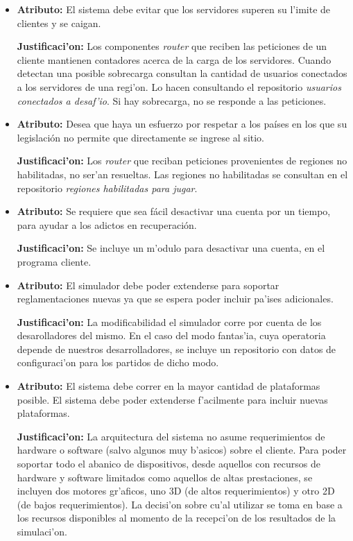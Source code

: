 \begin{itemize}
\item \textbf{Atributo:} El sistema debe evitar que los servidores superen su l'imite de clientes y se caigan.

 \textbf{Justificaci'on:} Los componentes \textit{router} que reciben las peticiones de un cliente mantienen contadores acerca de la carga de los servidores. Cuando detectan una posible sobrecarga consultan la cantidad de usuarios conectados a los servidores de una regi'on. Lo hacen consultando el repositorio \textit{usuarios conectados a desaf'io}. Si hay sobrecarga, no se responde a las peticiones.

\item \textbf{Atributo:} Desea que haya un esfuerzo por respetar a los países en los que su legislación no permite que directamente se ingrese al sitio.

\textbf{Justificaci'on:} Los \textit{router} que reciban peticiones provenientes de regiones no habilitadas, no ser'an resueltas. Las regiones no habilitadas se consultan en el repositorio \textit{regiones habilitadas para jugar}.

\item \textbf{Atributo:} Se requiere que sea fácil desactivar una cuenta por un tiempo, para ayudar a los adictos en recuperación.

\textbf{Justificaci'on:} Se incluye un m'odulo para desactivar una cuenta, en el programa cliente.

\item \textbf{Atributo:} El simulador debe poder extenderse para soportar reglamentaciones nuevas ya que se espera poder incluir pa'ises adicionales.

 \textbf{Justificaci'on:} La modificabilidad el simulador corre por cuenta de los desarolladores del mismo. En el caso del modo fantas'ia, cuya operatoria depende de nuestros desarrolladores, se incluye un repositorio con datos de configuraci'on para los partidos de dicho modo.

\item \textbf{Atributo:} El sistema debe correr en la mayor cantidad de plataformas posible. El sistema debe poder extenderse f'acilmente para incluir nuevas plataformas.

 \textbf{Justificaci'on:} La arquitectura del sistema no asume requerimientos de hardware o software (salvo algunos muy b'asicos) sobre el cliente. Para poder soportar todo el abanico de dispositivos, desde aquellos con recursos de hardware y software limitados como aquellos de altas prestaciones, se incluyen dos motores gr'aficos, uno 3D (de altos requerimientos) y otro 2D (de bajos requerimientos). La decisi'on sobre cu'al utilizar se toma en base a los recursos disponibles al momento de la recepci'on de los resultados de la simulaci'on.


\end{itemize}
